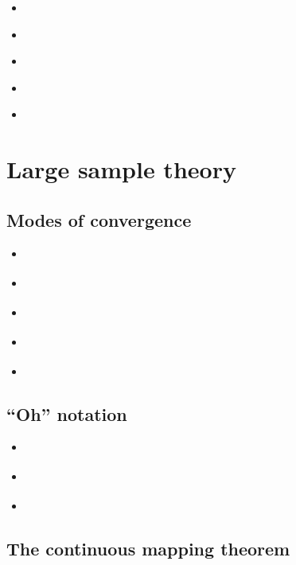 \documentclass{report}
\begin{document}
\begin{itemize}
    \item \cite[Chapter~15]{faraway_extending_2016}
    \item \cite[Chapters~4-7]{wood_generalized_2017}
    \item \cite[Chapters~4-7]{hastie_generalized_1990}
    \item \cite[Chapter~9.1]{hastie_elements_2009}
    \item \cite{rigby_generalized_2005}
\end{itemize}

\section{Large sample theory}\label{sec:reading-lst}

\subsection{Modes of convergence}

\begin{itemize}
    \item \cite[Chapter~2.1]{van_der_vaart_asymptotic_1998}
    \item \cite[Chapter~1.1]{dasgupta_asymptotic_2008}
    \item \cite[Chapter 5.5]{casella_statistical_2002}
    \item \cite[Chapter~2]{lehmann_elements_1999}
    \item \cite[Chapter~1.2-6]{serfling_approximation_1980}
\end{itemize}

\subsection{``Oh'' notation}

\begin{itemize}
    \item \cite[Chapter~2.2]{van_der_vaart_asymptotic_1998}
    \item \cite[Chapter~1.4]{lehmann_elements_1999}
    \item \cite[Chapter~1.1]{serfling_approximation_1980}
\end{itemize}

\subsection{The continuous mapping theorem}
\end{document}
